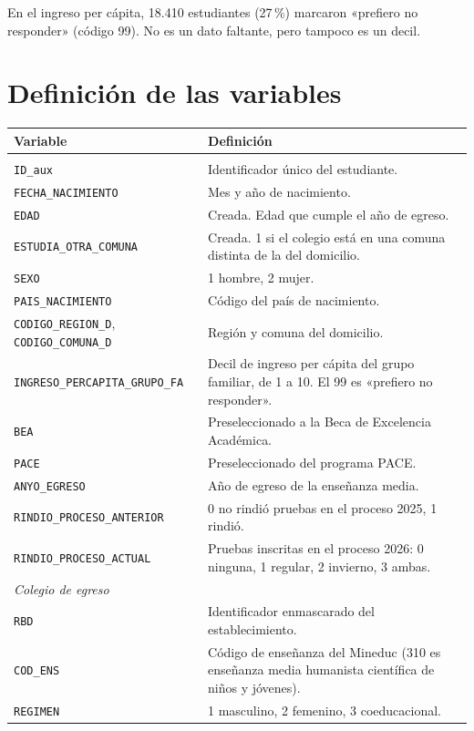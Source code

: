 \documentclass[11pt,letterpaper]{article}
\begin{document}
En el ingreso per cápita, 18.410 estudiantes (27\,\%) marcaron «prefiero no responder» (código 99). No es un dato faltante, pero tampoco es un decil.

\section{Definición de las variables}

\begin{longtable}{p{5.2cm}p{9.8cm}}
\toprule
Variable & Definición \\
\midrule
\endhead
\bottomrule
\endfoot
\multicolumn{2}{l}{\textit{Estudiante}} \\
\texttt{ID\_aux} & Identificador único del estudiante. \\
\texttt{FECHA\_NACIMIENTO} & Mes y año de nacimiento. \\
\texttt{EDAD} & Creada. Edad que cumple el año de egreso. \\
\texttt{ESTUDIA\_OTRA\_COMUNA} & Creada. 1 si el colegio está en una comuna distinta de la del domicilio. \\
\texttt{SEXO} & 1 hombre, 2 mujer. \\
\texttt{PAIS\_NACIMIENTO} & Código del país de nacimiento. \\
\texttt{CODIGO\_REGION\_D}, \texttt{CODIGO\_COMUNA\_D} & Región y comuna del domicilio. \\
\texttt{INGRESO\_PERCAPITA\_GRUPO\_FA} & Decil de ingreso per cápita del grupo familiar, de 1 a 10. El 99 es «prefiero no responder». \\
\texttt{BEA} & Preseleccionado a la Beca de Excelencia Académica. \\
\texttt{PACE} & Preseleccionado del programa PACE. \\
\texttt{ANYO\_EGRESO} & Año de egreso de la enseñanza media. \\
\texttt{RINDIO\_PROCESO\_ANTERIOR} & 0 no rindió pruebas en el proceso 2025, 1 rindió. \\
\texttt{RINDIO\_PROCESO\_ACTUAL} & Pruebas inscritas en el proceso 2026: 0 ninguna, 1 regular, 2 invierno, 3 ambas. \\
\midrule
\multicolumn{2}{l}{\textit{Colegio de egreso}} \\
\texttt{RBD} & Identificador enmascarado del establecimiento. \\
\texttt{COD\_ENS} & Código de enseñanza del Mineduc (310 es enseñanza media humanista científica de niños y jóvenes). \\
\texttt{REGIMEN} & 1 masculino, 2 femenino, 3 coeducacional. \\

\end{longtable}
\end{document}

